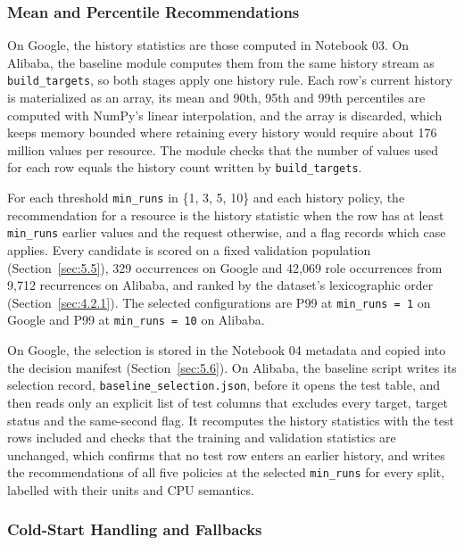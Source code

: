 \subsubsection{Mean and Percentile Recommendations}\label{sec:5.2.2}

On Google, the history statistics are those computed in Notebook 03. On Alibaba, the baseline module computes them from the same history stream as \texttt{build\_targets}, so both stages apply one history rule. Each row's current history is materialized as an array, its mean and 90th, 95th and 99th percentiles are computed with NumPy's linear interpolation, and the array is discarded, which keeps memory bounded where retaining every history would require about 176 million values per resource. The module checks that the number of values used for each row equals the history count written by \texttt{build\_targets}.

For each threshold \texttt{min\_runs} in \{1, 3, 5, 10\} and each history policy, the recommendation for a resource is the history statistic when the row has at least \texttt{min\_runs} earlier values and the request otherwise, and a flag records which case applies. Every candidate is scored on a fixed validation population (Section~\ref{sec:5.5}), 329 occurrences on Google and 42,069 role occurrences from 9,712 recurrences on Alibaba, and ranked by the dataset's lexicographic order (Section~\ref{sec:4.2.1}). The selected configurations are P99 at \texttt{min\_runs\ =\ 1} on Google and P99 at \texttt{min\_runs\ =\ 10} on Alibaba.

On Google, the selection is stored in the Notebook 04 metadata and copied into the decision manifest (Section~\ref{sec:5.6}). On Alibaba, the baseline script writes its selection record, \texttt{baseline\_selection.json}, before it opens the test table, and then reads only an explicit list of test columns that excludes every target, target status and the same-second flag. It recomputes the history statistics with the test rows included and checks that the training and validation statistics are unchanged, which confirms that no test row enters an earlier history, and writes the recommendations of all five policies at the selected \texttt{min\_runs} for every split, labelled with their units and CPU semantics.

\subsubsection{Cold-Start Handling and Fallbacks}\label{sec:5.2.3}

